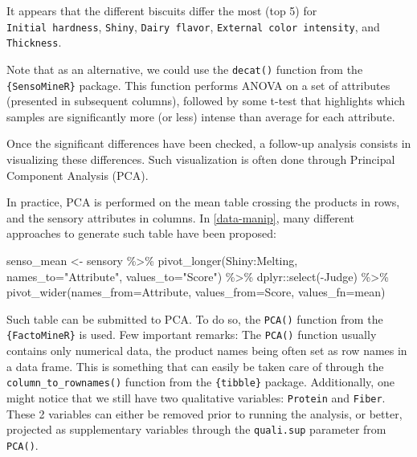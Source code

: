 \documentclass[
]{book}
\newenvironment{Shaded}{\begin{snugshade}}{\end{snugshade}}
\newcommand{\AttributeTok}[1]{\textcolor[rgb]{0.77,0.63,0.00}{#1}}
\newcommand{\FunctionTok}[1]{\textcolor[rgb]{0.00,0.00,0.00}{#1}}
\newcommand{\NormalTok}[1]{#1}
\newcommand{\OtherTok}[1]{\textcolor[rgb]{0.56,0.35,0.01}{#1}}
\newcommand{\SpecialCharTok}[1]{\textcolor[rgb]{0.00,0.00,0.00}{#1}}
\newcommand{\StringTok}[1]{\textcolor[rgb]{0.31,0.60,0.02}{#1}}
\begin{document}
It appears that the different biscuits differ the most (top 5) for \texttt{Initial\ hardness}, \texttt{Shiny}, \texttt{Dairy\ flavor}, \texttt{External\ color\ intensity}, and \texttt{Thickness}.

Note that as an alternative, we could use the \texttt{decat()} function from the \texttt{\{SensoMineR\}} package. This function performs ANOVA on a set of attributes (presented in subsequent columns), followed by some t-test that highlights which samples are significantly more (or less) intense than average for each attribute.

Once the significant differences have been checked, a follow-up analysis consists in visualizing these differences. Such visualization is often done through Principal Component Analysis (PCA).

In practice, PCA is performed on the mean table crossing the products in rows, and the sensory attributes in columns. In \ref{data-manip}, many different approaches to generate such table have been proposed:

\begin{Shaded}
\begin{Highlighting}[]
\NormalTok{senso\_mean }\OtherTok{\textless{}{-}}\NormalTok{ sensory }\SpecialCharTok{\%\textgreater{}\%} 
  \FunctionTok{pivot\_longer}\NormalTok{(Shiny}\SpecialCharTok{:}\NormalTok{Melting, }\AttributeTok{names\_to=}\StringTok{"Attribute"}\NormalTok{, }\AttributeTok{values\_to=}\StringTok{"Score"}\NormalTok{) }\SpecialCharTok{\%\textgreater{}\%} 
\NormalTok{  dplyr}\SpecialCharTok{::}\FunctionTok{select}\NormalTok{(}\SpecialCharTok{{-}}\NormalTok{Judge) }\SpecialCharTok{\%\textgreater{}\%} 
  \FunctionTok{pivot\_wider}\NormalTok{(}\AttributeTok{names\_from=}\NormalTok{Attribute, }\AttributeTok{values\_from=}\NormalTok{Score, }\AttributeTok{values\_fn=}\NormalTok{mean)}
\end{Highlighting}
\end{Shaded}

Such table can be submitted to PCA. To do so, the \texttt{PCA()} function from the \texttt{\{FactoMineR\}} is used.
Few important remarks: The \texttt{PCA()} function usually contains only numerical data, the product names being often set as row names in a data frame. This is something that can easily be taken care of through the \texttt{column\_to\_rownames()} function from the \texttt{\{tibble\}} package. Additionally, one might notice that we still have two qualitative variables: \texttt{Protein} and \texttt{Fiber}. These 2 variables can either be removed prior to running the analysis, or better, projected as supplementary variables through the \texttt{quali.sup} parameter from \texttt{PCA()}.
\end{document}
